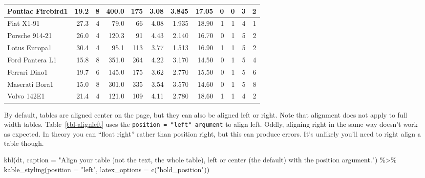 \documentclass[
  letterpaper,
  DIV=11,
  numbers=noendperiod]{scrartcl}
\newenvironment{Shaded}{\begin{snugshade}}{\end{snugshade}}
\newcommand{\AttributeTok}[1]{\textcolor[rgb]{0.40,0.45,0.13}{#1}}
\newcommand{\FunctionTok}[1]{\textcolor[rgb]{0.28,0.35,0.67}{#1}}
\newcommand{\NormalTok}[1]{\textcolor[rgb]{0.00,0.23,0.31}{#1}}
\newcommand{\SpecialCharTok}[1]{\textcolor[rgb]{0.37,0.37,0.37}{#1}}
\newcommand{\StringTok}[1]{\textcolor[rgb]{0.13,0.47,0.30}{#1}}
\begin{document}
\begin{longtable}[t]{l|r|r|r|r|r|r|r|r|r|r|r}
\hline
Pontiac Firebird1 & 19.2 & 8 & 400.0 & 175 & 3.08 & 3.845 & 17.05 & 0 & 0 & 3 & 2\\
\hline
Fiat X1-91 & 27.3 & 4 & 79.0 & 66 & 4.08 & 1.935 & 18.90 & 1 & 1 & 4 & 1\\
\hline
Porsche 914-21 & 26.0 & 4 & 120.3 & 91 & 4.43 & 2.140 & 16.70 & 0 & 1 & 5 & 2\\
\hline
Lotus Europa1 & 30.4 & 4 & 95.1 & 113 & 3.77 & 1.513 & 16.90 & 1 & 1 & 5 & 2\\
\hline
Ford Pantera L1 & 15.8 & 8 & 351.0 & 264 & 4.22 & 3.170 & 14.50 & 0 & 1 & 5 & 4\\
\hline
Ferrari Dino1 & 19.7 & 6 & 145.0 & 175 & 3.62 & 2.770 & 15.50 & 0 & 1 & 5 & 6\\
\hline
Maserati Bora1 & 15.0 & 8 & 301.0 & 335 & 3.54 & 3.570 & 14.60 & 0 & 1 & 5 & 8\\
\hline
Volvo 142E1 & 21.4 & 4 & 121.0 & 109 & 4.11 & 2.780 & 18.60 & 1 & 1 & 4 & 2\\
\hline

\end{longtable}

By default, tables are aligned center on the page, but they can also be
aligned left or right. Note that alignment does not apply to full width
tables. Table~\ref{tbl-alignleft} uses the
\texttt{position\ =\ "left"\ argument} to align left. Oddly, aligning
right in the same way doesn't work as expected. In theory you can
``float right'' rather than position right, but this can produce errors.
It's unlikely you'll need to right align a table though.

\begin{Shaded}
\begin{Highlighting}[]
\FunctionTok{kbl}\NormalTok{(dt, }
    \AttributeTok{caption =} \StringTok{"Align your table (not the text, the whole table), \textquotesingle{}left\textquotesingle{} or \textquotesingle{}center\textquotesingle{} (the default) with the position argument."}\NormalTok{) }\SpecialCharTok{\%\textgreater{}\%} 
  \FunctionTok{kable\_styling}\NormalTok{(}\AttributeTok{position =} \StringTok{"left"}\NormalTok{, }\AttributeTok{latex\_options =} \FunctionTok{c}\NormalTok{(}\StringTok{"hold\_position"}\NormalTok{))}
\end{Highlighting}
\end{Shaded}
\end{document}
